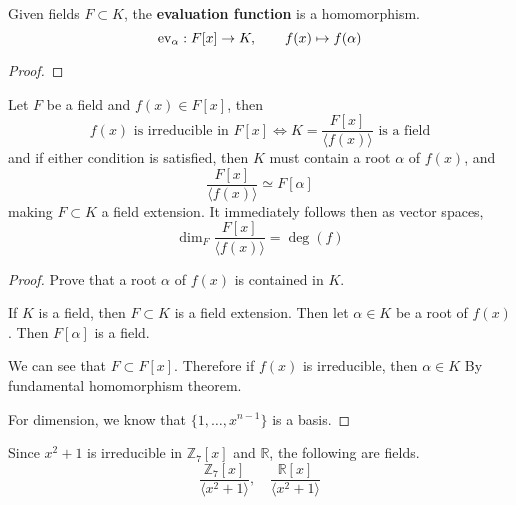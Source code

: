   \begin{lemma}
    Given fields $F \subset K$, the \textbf{evaluation function} is a homomorphism. 
    \begin{equation}
      \operatorname{ev}_\alpha: F[x] \rightarrow K, \qquad f(x) \mapsto f(\alpha)
    \end{equation}
  \end{lemma}
  \begin{proof}
    
  \end{proof} 

  \begin{theorem}
    Let $F$ be a field and $f(x) \in F[x]$, then 
    \begin{equation}
      f(x) \text{ is irreducible in } F[x] \iff K = \frac{F[x]}{\langle f(x) \rangle} \text{ is a field}
    \end{equation} 
    and if either condition is satisfied, then $K$ must contain  a root $\alpha$ of $f(x)$, and 
    \begin{equation}
      \frac{F[x]}{\langle f(x) \rangle} \simeq F[\alpha]
    \end{equation}
    making $F \subset K$ a field extension. It immediately follows then as vector spaces, 
    \begin{equation}
      \dim_F \frac{F[x]}{\langle f(x) \rangle} = \deg(f)
    \end{equation}
  \end{theorem}
  \begin{proof} 
    Prove that a root $\alpha$ of $f(x)$ is contained in $K$. 

    If $K$ is a field, then $F \subset K$ is a field extension. Then let $\alpha \in K$ be a root of $f(x)$. Then $F[\alpha]$ is a field.  

    We can see that $F \subset F[x]$. Therefore if $f(x)$ is irreducible, then $\alpha \in K$
    By fundamental homomorphism theorem. 

    For dimension, we know that $\{1, \ldots, x^{n-1}\}$ is a basis. 
  \end{proof}
  
  \begin{example}
    Since $x^2 + 1$ is irreducible in $\mathbb{Z}_7 [x]$ and $\mathbb{R}$, the following are fields. 
    \begin{equation}
      \frac{\mathbb{Z}_7 [x]}{\langle x^2 + 1 \rangle}, \quad \frac{\mathbb{R}[x]}{\langle x^2 + 1 \rangle}
    \end{equation}
  \end{example}


